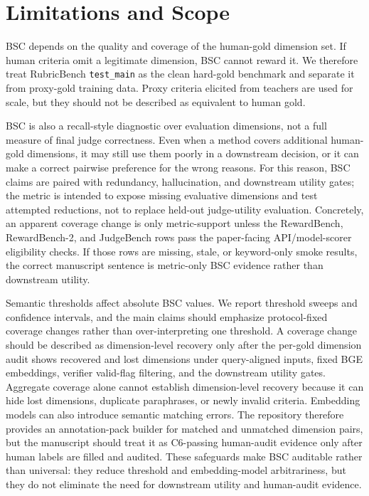 \section{Limitations and Scope}

BSC depends on the quality and coverage of the human-gold dimension set. If human
criteria omit a legitimate dimension, BSC cannot reward it. We therefore treat
RubricBench \texttt{test\_main} as the clean hard-gold benchmark and separate
it from proxy-gold training data. Proxy criteria elicited from teachers are used
for scale, but they should not be described as equivalent to human gold.

BSC is also a recall-style diagnostic over evaluation dimensions, not a full
measure of final judge correctness. Even when a method covers additional
human-gold dimensions, it may still use them poorly in a downstream decision,
or it can make a correct pairwise preference for the wrong reasons. For this
reason, BSC claims are paired with redundancy, hallucination, and downstream
utility gates;
the metric is intended to expose missing evaluative dimensions and test
attempted reductions, not to replace held-out judge-utility evaluation.
Concretely, an apparent coverage change is only metric-support unless the
RewardBench, RewardBench-2, and JudgeBench rows pass the paper-facing
API/model-scorer eligibility checks. If those rows are missing, stale, or
keyword-only smoke results, the correct manuscript sentence is metric-only BSC
evidence rather than downstream utility.

Semantic thresholds affect absolute BSC values. We report threshold sweeps and
confidence intervals, and the main claims should emphasize protocol-fixed
coverage changes rather than over-interpreting one threshold. A coverage change
should be described as dimension-level recovery only after the per-gold
dimension audit shows recovered and lost dimensions under query-aligned inputs,
fixed BGE embeddings, verifier valid-flag filtering, and the downstream utility gates.
Aggregate coverage alone cannot establish dimension-level recovery because it
can hide lost dimensions, duplicate paraphrases, or newly invalid criteria.
Embedding models can also introduce semantic matching errors. The repository
therefore provides an annotation-pack builder for matched and unmatched
dimension pairs, but the manuscript should treat it as C6-passing
human-audit evidence only after human labels are filled and audited. These safeguards make BSC
auditable rather than universal: they reduce threshold and embedding-model
arbitrariness, but they do not eliminate the need for downstream utility and
human-audit evidence.

